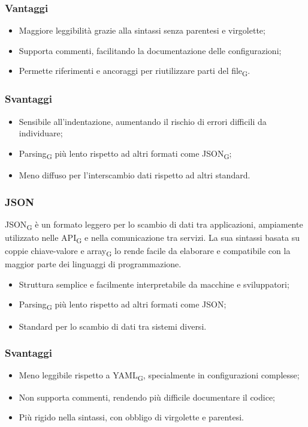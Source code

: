 \subsubsection{Vantaggi}
\begin{itemize}
    \item Maggiore leggibilità grazie alla sintassi senza parentesi e virgolette;
    \item Supporta commenti, facilitando la documentazione delle configurazioni;
    \item Permette riferimenti e ancoraggi per riutilizzare parti del file\textsubscript{G}.
\end{itemize}
\subsubsection{Svantaggi}
\begin{itemize}
    \item Sensibile all’indentazione, aumentando il rischio di errori difficili da individuare;
    \item Parsing\textsubscript{G} più lento rispetto ad altri formati come JSON\textsubscript{G};
    \item Meno diffuso per l’interscambio dati rispetto ad altri standard.
\end{itemize}

\subsubsection{JSON}
JSON\textsubscript{G} è un formato leggero per lo scambio di dati tra applicazioni, ampiamente utilizzato nelle API\textsubscript{G} e nella comunicazione tra servizi. La sua sintassi basata su coppie chiave-valore e array\textsubscript{G} lo rende facile da elaborare e compatibile con la maggior parte dei linguaggi di programmazione.
\begin{itemize}
    \item Struttura semplice e facilmente interpretabile da macchine e sviluppatori;
    \item Parsing\textsubscript{G} più lento rispetto ad altri formati come JSON;
    \item Standard per lo scambio di dati tra sistemi diversi.
\end{itemize}
\subsubsection{Svantaggi}
\begin{itemize}
    \item Meno leggibile rispetto a YAML\textsubscript{G}, specialmente in configurazioni complesse;
    \item Non supporta commenti, rendendo più difficile documentare il codice;
    \item Più rigido nella sintassi, con obbligo di virgolette e parentesi.
\end{itemize}
